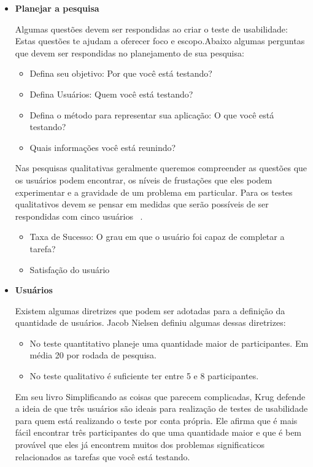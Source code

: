 \begin{itemize}
\item \textbf{Planejar a pesquisa}

Algumas questões devem ser respondidas ao criar o teste de usabilidade: Estas questões te ajudam a oferecer foco e escopo.Abaixo algumas perguntas que devem ser respondidas no planejamento de sua pesquisa:

\begin{itemize}
\item Defina seu objetivo: Por que você está testando? %
\item Defina Usuários: Quem você está testando? %
\item Defina o método para representar sua aplicação: O que você está testando?
\item Quais informações você está reunindo? 
\end{itemize}

Nas pesquisas qualitativas geralmente queremos compreender as questões que os usuários podem encontrar, os níveis de frustações que eles podem experimentar e a gravidade de um problema em particular. Para os testes qualitativos devem se pensar em medidas que serão possíveis de ser respondidas com cinco usuários ~\cite{unger2009}. 

	\begin{itemize}
		\item Taxa de Sucesso: O grau em que o usuário foi capaz de completar a tarefa?
		\item Satisfação do usuário
	\end{itemize}

\item \textbf{Usuários}

Existem algumas diretrizes que podem ser adotadas para a definição da quantidade de usuários. Jacob Nielsen definiu algumas dessas diretrizes:

\begin{itemize}
\item No teste quantitativo planeje uma quantidade maior de participantes. Em média 20 por rodada de pesquisa.
\item No teste qualitativo é suficiente ter entre 5 e 8 participantes.
\end{itemize}

	Em seu livro Simplificando as coisas que parecem complicadas, Krug defende a ideia de que três usuários são ideais para realização de testes de usabilidade para quem está realizando o teste por conta própria. Ele afirma que é mais fácil encontrar três participantes do que uma quantidade maior e que é bem provável que eles já encontrem muitos dos problemas significaticos relacionados as tarefas que você está testando.


\end{itemize}
